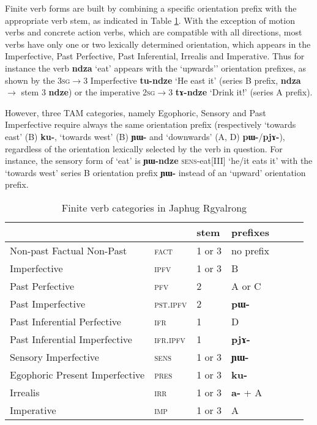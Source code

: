 \documentclass[oldfontcommands,oneside,a4paper,11pt]{article}
\newcommand{\ipa}[1]{\mbox{\phon\textbf{#1}}} %
\begin{document}
Finite verb forms are built by combining a specific orientation prefix with the appropriate verb stem, as indicated in Table \ref{tab:finite.forms}. With the exception of motion verbs and concrete action verbs, which are compatible with all directions, most verbs have only one or two lexically determined orientation, which appears in the Imperfective, Past Perfective, Past Inferential, Irrealis and Imperative. Thus for  instance the verb \ipa{ndza} `eat' appears with the `upwards'' orientation prefixes, as shown by the \textsc{3sg$\rightarrow$3} Imperfective \ipa{tu-ndze} `He east it' (series B prefix, \ipa{ndza} $\rightarrow$ stem 3 \ipa{ndze}) or the imperative \textsc{2sg$\rightarrow$3} \ipa{tɤ-ndze} `Drink it!' (series A prefix).

However, three TAM categories, namely Egophoric, Sensory and Past Imperfective require always the same orientation prefix (respectively `towards east' (B) \ipa{ku-}, `towards west' (B) \ipa{ɲɯ-} and `downwards' (A, D) \ipa{pɯ-}/\ipa{pjɤ-}), regardless of the orientation lexically selected by the verb in question. For instance, the sensory form of `eat' is \ipa{ɲɯ-ndze} \textsc{sens}-eat[III] `he/it eats it' with the `towards west' series B orientation prefix \ipa{ɲɯ-} instead of an `upward' orientation prefix.

\begin{table}[H]
\caption{Finite verb categories in Japhug Rgyalrong} \label{tab:finite.forms} \centering
\begin{tabular}{lllllll}
\toprule
&	&	stem&	prefixes\\
\midrule
Non-past Factual Non-Past&	\textsc{fact} &	1 or 3&	no prefix\\
Imperfective&	\textsc{ipfv} &	1 or 3&	B\\
Past Perfective &	\textsc{pfv} &	2&	A or C\\
Past Imperfective &	\textsc{pst.ipfv} &	2&	\ipa{pɯ-}\\
Past Inferential Perfective &	\textsc{ifr} &	1&	D\\
Past Inferential Imperfective&	\textsc{ifr.ipfv} &	1&	\ipa{pjɤ-}\\
Sensory Imperfective&	\textsc{sens} &	1 or 3&	\ipa{ɲɯ-}\\
Egophoric Present Imperfective&	\textsc{pres} &	1 or 3&	\ipa{ku-}\\
Irrealis&	\textsc{irr} &	1 or 3&	\ipa{a-} + A\\
Imperative&	\textsc{imp} &	1 or 3&	A\\
\bottomrule
\end{tabular}
\end{table}
\end{document}
